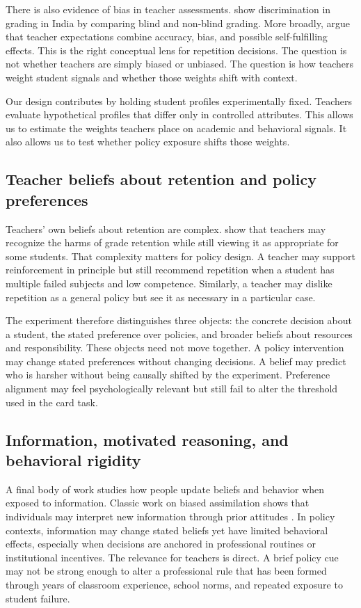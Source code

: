 \documentclass[12pt,a4paper]{article}
\begin{document}
There is also evidence of bias in teacher assessments. \citet{hanna2012} show discrimination in grading in India by comparing blind and non-blind grading. More broadly, \citet{jussim2005} argue that teacher expectations combine accuracy, bias, and possible self-fulfilling effects. This is the right conceptual lens for repetition decisions. The question is not whether teachers are simply biased or unbiased. The question is how teachers weight student signals and whether those weights shift with context.

Our design contributes by holding student profiles experimentally fixed. Teachers evaluate hypothetical profiles that differ only in controlled attributes. This allows us to estimate the weights teachers place on academic and behavioral signals. It also allows us to test whether policy exposure shifts those weights.

\subsection{Teacher beliefs about retention and policy preferences}

Teachers' own beliefs about retention are complex. \citet{tomchin1992} show that teachers may recognize the harms of grade retention while still viewing it as appropriate for some students. That complexity matters for policy design. A teacher may support reinforcement in principle but still recommend repetition when a student has multiple failed subjects and low competence. Similarly, a teacher may dislike repetition as a general policy but see it as necessary in a particular case.

The experiment therefore distinguishes three objects: the concrete decision about a student, the stated preference over policies, and broader beliefs about resources and responsibility. These objects need not move together. A policy intervention may change stated preferences without changing decisions. A belief may predict who is harsher without being causally shifted by the experiment. Preference alignment may feel psychologically relevant but still fail to alter the threshold used in the card task.

\subsection{Information, motivated reasoning, and behavioral rigidity}

A final body of work studies how people update beliefs and behavior when exposed to information. Classic work on biased assimilation shows that individuals may interpret new information through prior attitudes \citep{lord1979}. In policy contexts, information may change stated beliefs yet have limited behavioral effects, especially when decisions are anchored in professional routines or institutional incentives. The relevance for teachers is direct. A brief policy cue may not be strong enough to alter a professional rule that has been formed through years of classroom experience, school norms, and repeated exposure to student failure.
\end{document}
